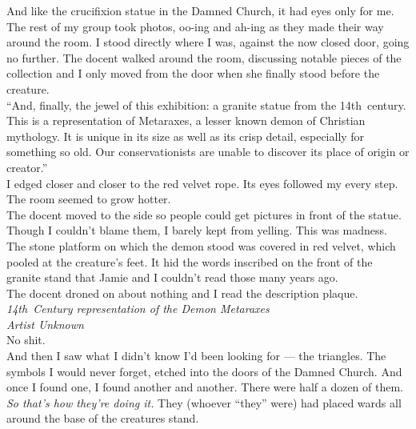 \documentclass[a5paper]{scrartcl}
\begin{document}
And like the crucifixion statue in the Damned Church, it had eyes only for me.\\


The rest of my group took photos, oo-ing and ah-ing as they made their way around the room. I stood directly where I was, against the now closed door, going no further. The docent walked around the room, discussing notable pieces of the collection and I only moved from the door when she finally stood before the creature.\\


\enquote{And, finally, the jewel of this exhibition: a granite statue from the 14th~century. This is a representation of Metaraxes, a lesser known demon of Christian mythology. It is unique in its size as well as its crisp detail, especially for something so old. Our conservationists are unable to discover its place of origin or creator.}\\


I edged closer and closer to the red velvet rope. Its eyes followed my every step. The room seemed to grow hotter. \\


The docent moved to the side so people could get pictures in front of the statue. Though I couldn't blame them, I barely kept from yelling. This was madness.\\


The stone platform on which the demon stood was covered in red velvet, which pooled at the creature's feet. It hid the words inscribed on the front of the granite stand that Jamie and I couldn't read those many years ago.\\


The docent droned on about nothing and I read the description plaque.\\


\textit{14th~Century representation of the Demon Metaraxes}
\\


\textit{Artist Unknown}
\\


No shit.\\


And then I saw what I didn't know I'd been looking for --- the triangles. The symbols I would never forget, etched into the doors of the Damned Church. And once I found one, I found another and another. There were half a dozen of them. \textit{So that's how they're doing it.}
 They (whoever \enquote{they} were) had placed wards all around the base of the creatures stand. \\
\end{document}

